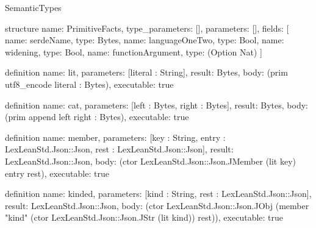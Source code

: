 \begin{lexlean}{SemanticTypes}
\begin{semanticmodule}
structure{
  name: PrimitiveFacts,
  type_parameters: [],
  parameters: [],
  fields: [
    {name: serdeName, type: Bytes},
    {name: languageOneTwo, type: Bool},
    {name: widening, type: Bool},
    {name: functionArgument, type: (Option Nat)}
  ]
}

definition{
  name: lit,
  parameters: [literal : String],
  result: Bytes,
  body: (prim utf8_encode literal : Bytes),
  executable: true
}

definition{
  name: cat,
  parameters: [left : Bytes, right : Bytes],
  result: Bytes,
  body: (prim append left right : Bytes),
  executable: true
}

definition{
  name: member,
  parameters: [key : String, entry : LexLeanStd.Json::Json, rest : LexLeanStd.Json::Json],
  result: LexLeanStd.Json::Json,
  body: (ctor LexLeanStd.Json::Json.JMember (lit key) entry rest),
  executable: true
}

definition{
  name: kinded,
  parameters: [kind : String, rest : LexLeanStd.Json::Json],
  result: LexLeanStd.Json::Json,
  body: (ctor LexLeanStd.Json::Json.JObj (member "kind" (ctor LexLeanStd.Json::Json.JStr (lit kind)) rest)),
  executable: true
}


\end{semanticmodule}
\end{lexlean}
